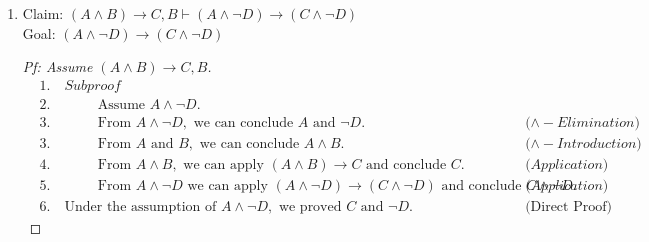 \documentclass{article}
\begin{document}
\begin{enumerate}
\begin{enumerate}
        \item
        Claim: $(A \land B) \rightarrow C, B \vdash (A \land \neg D) \rightarrow (C \land \neg D)$ \\
        Goal: $(A \land \neg D) \rightarrow (C \land \neg D)$
        \begin{proof}[Pf: Assume $(A \land B) \rightarrow C, B$]
            \begin{align*}
                &1. \quad Subproof \\
                &2. \quad \hspace{1cm} \text{Assume } A \land \neg D. \\
                &3. \quad \hspace{1cm} \text{From } A \land \neg D, \text{ we can conclude } A \text{ and } \neg D. && \text{($\land - Elimination$)} \\
                &3. \quad \hspace{1cm} \text{From } A \text{ and } B, \text{ we can conclude } A \land B. && \text{($\land - Introduction$)} \\
                &4. \quad \hspace{1cm} \text{From } A \land B, \text{ we can apply } (A \land B) \rightarrow C \text{ and conclude } C. && \text{($Application$)} \\
                &5. \quad \hspace{1cm} \text{From } A \land \neg D \text{ we can apply } (A \land \neg D) \rightarrow (C \land \neg D) \text{ and conclude } C \land \neg D. && \text{($Application$)} \\
                &6. \quad \text{Under the assumption of } A \land \neg D, \text{ we proved } C \text{ and } \neg D. && \text{(Direct Proof)}
            \end{align*}
        \end{proof}


\end{enumerate}
\end{enumerate}
\end{document}
